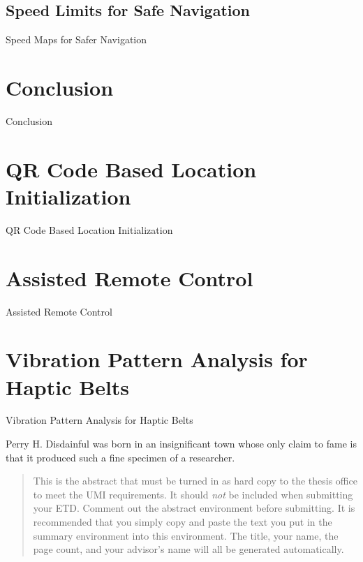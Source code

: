 \documentclass[12pt]{gatech-thesis}
\begin{document}
\section{Speed Limits for Safe Navigation}
\label{sec:navigation_speed_limits}

Speed Maps for Safer Navigation












\chapter{Conclusion}
\label{chapter:conclusion}

Conclusion

\appendix
\chapter{QR Code Based Location Initialization}
\label{chapter:qr_code_based_location_initialization}

QR Code Based Location Initialization

\chapter{Assisted Remote Control}
\label{chapter:assisted_remote_control}

Assisted Remote Control

\chapter{Vibration Pattern Analysis for Haptic Belts}
\label{chapter:vibration_pattern_analysis_for_haptic_belts}

Vibration Pattern Analysis for Haptic Belts


\begin{postliminary}
{}
\begin{vita}
Perry H. Disdainful was born in an insignificant town
whose only claim to fame is that it produced such a fine
specimen of a researcher.
\end{vita}
\end{postliminary}

\begin{abstract}
  This is the abstract that must be turned in as hard copy to the
  thesis office to meet the UMI requirements. It should \emph{not} be
  included when submitting your ETD. Comment out the abstract
  environment before submitting. It is recommended that you simply
  copy and paste the text you put in the summary environment into this
  environment. The title, your name, the page count, and your
  advisor's name will all be generated automatically.
\end{abstract}
\end{document}

